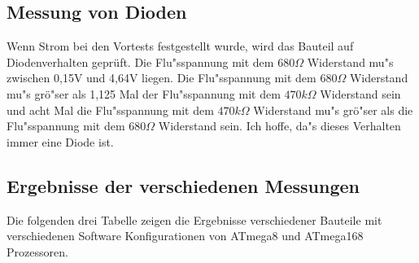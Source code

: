 \subsection{Messung von Dioden}
\label{sec:diode}
Wenn Strom bei den Vortests festgestellt wurde, wird das Bauteil auf Diodenverhalten gepr\"uft.
Die Flu"sspannung mit dem \(680\Omega\) Widerstand mu"s zwischen 0,15V und 4,64V liegen.
Die Flu"sspannung mit dem \(680\Omega\) Widerstand mu"s gr\"o"ser als 1,125 Mal der Flu"sspannung mit dem
 \(470k\Omega\) Widerstand sein und acht Mal die Flu"sspannung mit dem \(470k\Omega\) Widerstand mu"s
gr\"o"ser als die Flu"sspannung mit dem \(680\Omega\) Widerstand sein.
Ich hoffe, da"s dieses Verhalten immer eine Diode ist.

\subsection{Ergebnisse der verschiedenen Messungen}
Die folgenden drei Tabelle zeigen die Ergebnisse verschiedener Bauteile mit
verschiedenen Software Konfigurationen von ATmega8 und ATmega168 Prozessoren.

